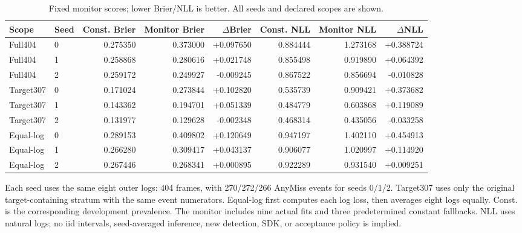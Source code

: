 \begin{table}[t]
\centering\footnotesize
\caption{Fixed monitor scores; lower Brier/NLL is better. All seeds and declared scopes are shown.}\label{tab:risk}
\setlength{\tabcolsep}{3pt}
\begin{tabular}{llrrrrrr}\toprule
Scope & Seed & Const. Brier & Monitor Brier & $\Delta$Brier & Const. NLL & Monitor NLL & $\Delta$NLL\\\midrule
Full404 & 0 & 0.275350 & 0.373000 & +0.097650 & 0.884444 & 1.273168 & +0.388724\\
Full404 & 1 & 0.258868 & 0.280616 & +0.021748 & 0.855498 & 0.919890 & +0.064392\\
Full404 & 2 & 0.259172 & 0.249927 & -0.009245 & 0.867522 & 0.856694 & -0.010828\\
Target307 & 0 & 0.171024 & 0.273844 & +0.102820 & 0.535739 & 0.909421 & +0.373682\\
Target307 & 1 & 0.143362 & 0.194701 & +0.051339 & 0.484779 & 0.603868 & +0.119089\\
Target307 & 2 & 0.131977 & 0.129628 & -0.002348 & 0.468314 & 0.435056 & -0.033258\\
Equal-log & 0 & 0.289153 & 0.409802 & +0.120649 & 0.947197 & 1.402110 & +0.454913\\
Equal-log & 1 & 0.266280 & 0.309417 & +0.043137 & 0.906077 & 1.020997 & +0.114920\\
Equal-log & 2 & 0.267446 & 0.268341 & +0.000895 & 0.922289 & 0.931540 & +0.009251\\
\bottomrule\end{tabular}
\par\vspace{3pt}\begin{minipage}{0.98\textwidth}\footnotesize Each seed uses the same eight outer logs: 404 frames, with 270/272/266 AnyMiss events for seeds 0/1/2. Target307 uses only the original target-containing stratum with the same event numerators. Equal-log first computes each log loss, then averages eight logs equally. Const. is the corresponding development prevalence. The monitor includes nine actual fits and three predetermined constant fallbacks. NLL uses natural logs; no iid intervals, seed-averaged inference, new detection, SDK, or acceptance policy is implied.\end{minipage}
\end{table}
